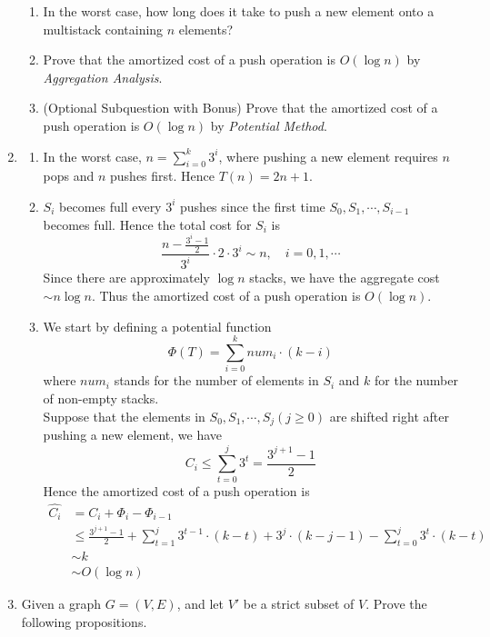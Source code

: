 \documentclass[12pt,a4paper]{article}
\makeatletter
\newtheorem*{solution}{Solution}
\theoremstyle{definition}
\renewenvironment{solution}[1][Solution] {\par\pushQED{\qed}\normalfont\topsep6\p@\@plus6\p@\relax\trivlist\item[\hskip\labelsep\bfseries#1\@addpunct{.}]\ignorespaces}{\popQED\endtrivlist\@endpefalse} \makeatother
\makeatother
\begin{document}
\begin{enumerate}
    \begin{enumerate}
        \item In the worst case, how long does it take to push a new element onto a multistack containing $n$ elements?
        \item Prove that the amortized cost of a push operation is $O(\log n)$ by \emph{Aggregation Analysis}.
        \item {\color{red}(Optional Subquestion with Bonus)} Prove that the amortized cost of a push operation is $O(\log n)$ by \emph{Potential Method}.
    \end{enumerate}
	\begin{solution}
		\hfill
		\begin{enumerate}
			\item 
			In the worst case, $n = \sum\limits_{i=0}^k 3^i$, where pushing a new element requires $n$ pops and $n$ pushes first. Hence $T(n) = 2n + 1$.
			\item
			$S_i$ becomes full every $3^i$ pushes since the first time $S_0, S_1, \cdots , S_{i-1}$ becomes full. Hence the total cost for $S_i$ is
			\[\frac{n - \frac{3^i-1}{2}}{3^i} \cdot 2 \cdot 3^i \sim n , \quad i = 0,1, \cdots\]
			Since there are approximately $\log n$ stacks, we have the aggregate cost $\sim n \log n$. Thus the amortized cost of a push operation is $O(\log n)$.
			\item
			We start by defining a potential function
			\[\Phi (T) = \sum_{i=0}^{k} num_i \cdot (k-i)\]
			where $num_i$ stands for the number of elements in $S_i$ and $k$ for the number of non-empty stacks. \\
			Suppose that the elements in $S_0, S_1, \cdots , S_j (j \geq 0)$ are shifted right after pushing a new element, we have
			\[C_i \leq \sum_{t=0}^{j} 3^t = \frac{3^{j+1} - 1}{2}\]
			Hence the amortized cost of a push operation is
			\begin{align*}
				\hat{C_i} & = C_i + \Phi_i - \Phi_{i-1} \\
				& \leq  \frac{3^{j+1} - 1}{2} + \sum_{t=1}^{j} 3^{t-1} \cdot (k-t) + 3^j \cdot (k-j-1) - \sum_{t=0}^{j} 3^{t} \cdot (k-t) \\
				& \sim k \\
				& \sim O(\log n)
			\end{align*}
			
		\end{enumerate}
	\end{solution}
	
	\item Given a graph $G = (V, E)$, and let $V'$ be a strict subset of $V$. Prove the following propositions.
	

\end{enumerate}
\end{document}
